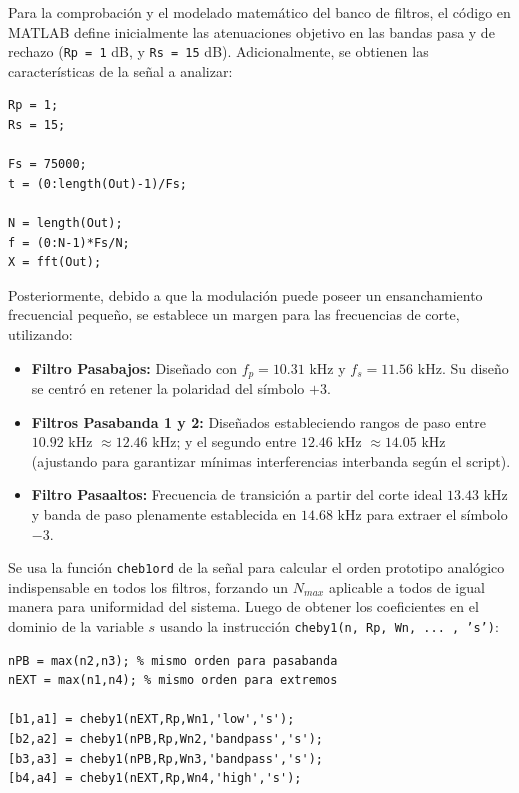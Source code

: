 \documentclass[9pt,a4paper,oneside]{rho-class/rho}
\begin{document}
    Para la comprobación y el modelado matemático del banco de filtros, el código en MATLAB define inicialmente las atenuaciones objetivo en las bandas pasa y de rechazo (\texttt{Rp = 1} dB, y \texttt{Rs = 15} dB). Adicionalmente, se obtienen las características de la señal a analizar:

\begin{verbatim}
Rp = 1;
Rs = 15;

Fs = 75000;
t = (0:length(Out)-1)/Fs;

N = length(Out);
f = (0:N-1)*Fs/N;
X = fft(Out);
\end{verbatim}

    Posteriormente, debido a que la modulación puede poseer un ensanchamiento frecuencial pequeño, se establece un margen para las frecuencias de corte, utilizando:
    
    \begin{itemize}
        \item \textbf{Filtro Pasabajos:} Diseñado con $f_p = 10.31$ kHz y $f_s = 11.56$ kHz. Su diseño se centró en retener la polaridad del símbolo $+3$.
        \item \textbf{Filtros Pasabanda 1 y 2:} Diseñados estableciendo rangos de paso entre $10.92$ kHz $\approx 12.46$ kHz; y el segundo entre $12.46$ kHz $\approx 14.05$ kHz (ajustando para garantizar mínimas interferencias interbanda según el script).
        \item \textbf{Filtro Pasaaltos:} Frecuencia de transición a partir del corte ideal $13.43$ kHz y banda de paso plenamente establecida en $14.68$ kHz para extraer el símbolo $-3$.
    \end{itemize}

    Se usa la función \texttt{cheb1ord} de la señal para calcular el orden prototipo analógico indispensable en todos los filtros, forzando un $N_{max}$ aplicable a todos de igual manera para uniformidad del sistema. Luego de obtener los coeficientes en el dominio de la variable $s$ usando la instrucción \texttt{cheby1(n, Rp, Wn, ... , 's')}:

\begin{verbatim}
nPB = max(n2,n3); % mismo orden para pasabanda
nEXT = max(n1,n4); % mismo orden para extremos

[b1,a1] = cheby1(nEXT,Rp,Wn1,'low','s');
[b2,a2] = cheby1(nPB,Rp,Wn2,'bandpass','s');
[b3,a3] = cheby1(nPB,Rp,Wn3,'bandpass','s');
[b4,a4] = cheby1(nEXT,Rp,Wn4,'high','s');
\end{verbatim}
\end{document}
